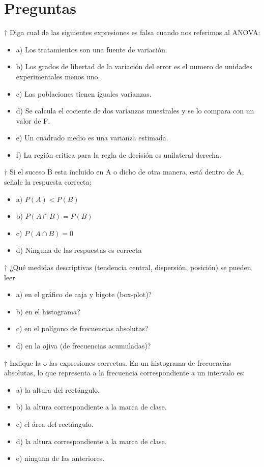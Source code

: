\documentclass[10pt,a4paper]{article}
\begin{document}
	\section{Preguntas}
$\dagger$	Diga cual de las siguientes expresiones es falsa cuando nos referimos al ANOVA:
	\begin{itemize}
		\item a) Los tratamientos son una fuente de variación.
		\item b) Los grados de libertad de la variación del error es el numero de unidades experimentales menos uno.
		\item c) Las poblaciones tienen iguales varianzas.
		\item d) Se calcula el cociente de dos varianzas muestrales y se lo compara con un valor de F.
		\item e) Un cuadrado medio es una varianza estimada.
		\item f) La región critica para la regla de decisión es unilateral derecha.
	\end{itemize}

$\dagger$ Si el suceso B esta incluido en A o dicho de otra manera, está dentro de A, señale la respuesta correcta:
\begin{itemize}
	\item a) $P(A)<P(B)$
	\item b) $P(A\cap B) = P(B)$
	\item c) $P(A\cap B) = 0$
	\item d) Ninguna de las respuestas es correcta 
\end{itemize}

$\dagger$ ¿Qué medidas descriptivas (tendencia central, dispersión, posición) se pueden leer
\begin{itemize}
	\item a) en el gráfico de caja y bigote (box-plot)?
	\item b) en el histograma?
	\item c) en el polígono de frecuencias absolutas?
	\item d) en la ojiva (de frecuencias acumuladas)?
\end{itemize}

$\dagger$ Indique la o las expresiones correctas. En un histograma de frecuencias absolutas, lo que representa a la frecuencia correspondiente a un intervalo es:
\begin{itemize}
	\item a) la altura del rectángulo.
	\item b) la altura correspondiente a la marca de clase.
	\item c) el área del rectángulo.
	\item d) la altura correspondiente a la marca de clase.
	\item e) ninguna de las anteriores.
\end{itemize}
\end{document}

